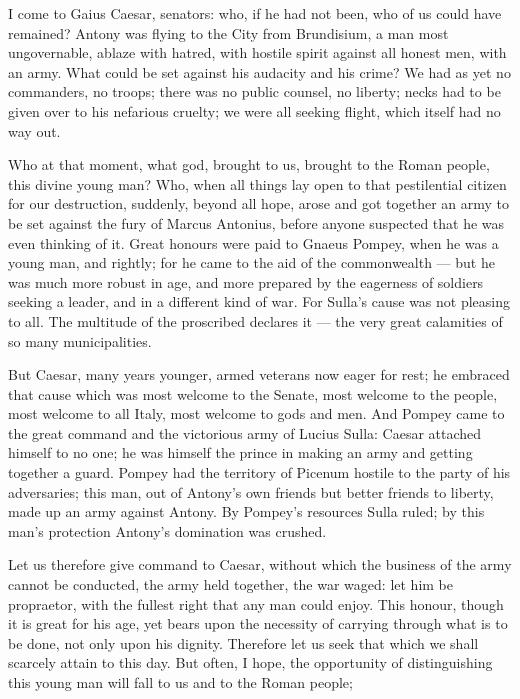  I come to Gaius Caesar, senators: who, if he had not been, who of us could have remained? Antony was flying to the City from Brundisium, a man most ungovernable, ablaze with hatred, with hostile spirit against all honest men, with an army. What could be set against his audacity and his crime? We had as yet no commanders, no troops; there was no public counsel, no liberty; necks had to be given over to his nefarious cruelty; we were all seeking flight, which itself had no way out.

 Who at that moment, what god, brought to us, brought to the Roman people, this divine young man? Who, when all things lay open to that pestilential citizen for our destruction, suddenly, beyond all hope, arose and got together an army to be set against the fury of Marcus Antonius, before anyone suspected that he was even thinking of it. Great honours were paid to Gnaeus Pompey, when he was a young man, and rightly; for he came to the aid of the commonwealth --- but he was much more robust in age, and more prepared by the eagerness of soldiers seeking a leader, and in a different kind of war. For Sulla's cause was not pleasing to all. The multitude of the proscribed declares it --- the very great calamities of so many municipalities.

 But Caesar, many years younger, armed veterans now eager for rest; he embraced that cause which was most welcome to the Senate, most welcome to the people, most welcome to all Italy, most welcome to gods and men. And Pompey came to the great command and the victorious army of Lucius Sulla: Caesar attached himself to no one; he was himself the prince in making an army and getting together a guard. Pompey had the territory of Picenum hostile to the party of his adversaries; this man, out of Antony's own friends but better friends to liberty, made up an army against Antony. By Pompey's resources Sulla ruled; by this man's protection Antony's domination was crushed.

 Let us therefore give command to Caesar, without which the business of the army cannot be conducted, the army held together, the war waged: let him be propraetor, with the fullest right that any man could enjoy. This honour, though it is great for his age, yet bears upon the necessity of carrying through what is to be done, not only upon his dignity. Therefore let us seek that which we shall scarcely attain to this day. But often, I hope, the opportunity of distinguishing this young man will fall to us and to the Roman people;

